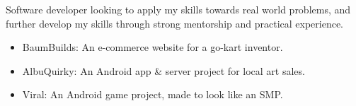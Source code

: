 \smallskip

\raggedright
{}
  Software developer looking to apply my skills towards real world problems, and further develop my skills through strong mentorship and practical experience.

  \medskip


\raggedright
{}
  \centering

  \divider
  

  \medskip


\raggedright
{}
  \centering

  \medskip


\raggedright
{}
  \begin{itemize}
    \item BaumBuilds: An e-commerce website for a go-kart inventor.
    \item AlbuQuirky: An Android app \& server project for local art sales.
    \item Viral: An Android game project, made to look like an SMP.
  \end{itemize}


\raggedright
{}
  \centering
